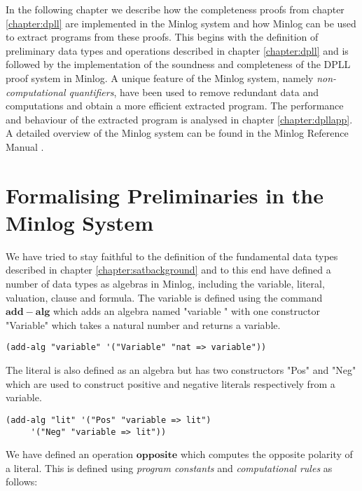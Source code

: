 
\label{chapter:dpllminlog}
In the following chapter we describe how the completeness proofs from chapter \ref{chapter:dpll} are implemented in the Minlog system and how Minlog can be used to extract programs from these proofs.  This begins with the definition of preliminary data types and operations described in chapter \ref{chapter:dpll} and is followed by the implementation of the soundness and completeness of the DPLL proof system in Minlog. A unique feature of the Minlog system, namely \emph{non-computational quantifiers}, have been used to remove redundant data and computations and obtain a more efficient extracted program. The performance and behaviour of the extracted program is analysed in chapter \ref{chapter:dpllapp}. A detailed overview of the Minlog system can be found in the Minlog Reference Manual \cite{MinlogRef}.

\section{Formalising Preliminaries in the Minlog System}
We have tried to stay faithful to the definition of the fundamental data types described in chapter \ref{chapter:satbackground} and to this end have defined a number of data types as algebras in Minlog, including the variable, literal, valuation, clause and formula. The variable is defined using the command $\mathbf{add-alg}$ which adds an algebra named "variable " with one constructor "Variable" which takes a natural number and returns a variable.
\begin{lstlisting}[caption = "Definition of a variable in Minlog"]
(add-alg "variable" '("Variable" "nat => variable"))
\end{lstlisting}
The literal is also defined as an algebra but has two constructors "Pos" and "Neg" which are used to construct positive and negative literals respectively from a variable.
\begin{lstlisting}[caption = "Definition of a literal in Minlog"]
(add-alg "lit" '("Pos" "variable => lit")
     '("Neg" "variable => lit"))
\end{lstlisting}

We have defined an operation $\mathbf{opposite}$ which computes the opposite polarity of a literal. This is defined using \emph{program constants} and \emph{computational rules} as follows:

